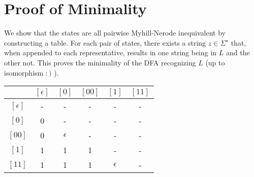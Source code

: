 \section{Proof of Minimality}
We show that the states are all pairwise Myhill-Nerode inequivalent by constructing a table. For each pair of states, there exists a string \( z \in \Sigma^\star \) that, when appended to each representative, results in one string being in \( L \) and the other not. This proves the minimality of the DFA recognizing \( L \) (up to isomorphism $:)$ ).

\begin{center}
\begin{tabular}{|c|c|c|c|c|c|}
    \hline
    & \([\epsilon]\) & \([0]\) & \([00]\) & \([1]\) & \([11]\) \\
    \hline
    \([\epsilon]\) & - & - & - & - & - \\
    \hline
    \([0]\) & 0 & - & - & - & - \\
    \hline
    \([00]\) & 0 & \( \epsilon \) & - & - & - \\
    \hline
    \([1]\) & 1 & 1 & 1 & - & - \\
    \hline
    \([11]\) & 1 & 1 & 1 & \( \epsilon \) & - \\
    \hline
\end{tabular}
\end{center}



